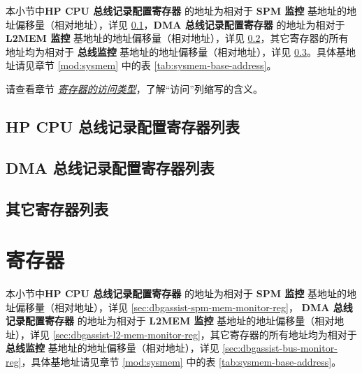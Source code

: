 \documentclass[main\_\_CN.tex]{subfiles}
\begin{document}
本小节中\textbf{HP CPU 总线记录配置寄存器} 的地址为相对于 \textbf{SPM 监控} 基地址的地址偏移量（相对地址），详见 \ref{sec:dbgassist-spm-mem-monitor-reg-summ}，\textbf{DMA 总线记录配置寄存器} 的地址为相对于 \textbf{L2MEM 监控} 基地址的地址偏移量（相对地址），详见 \ref{sec:dbgassist-l2-mem-monitor-reg-summ}，其它寄存器的所有地址均为相对于 \textbf{总线监控} 基地址的地址偏移量（相对地址），详见 \ref{sec:dbgassist-bus-monitor-reg-summ}。具体基地址请见章节 \ref{mod:sysmem} \textit{} 中的表 \ref{tab:sysmem-base-address}。

请查看章节 \hyperref[glossary-access-types]{\textit{寄存器的访问类型}}，了解“访问”列缩写的含义。

\subsection{HP CPU 总线记录配置寄存器列表}
\label{sec:dbgassist-spm-mem-monitor-reg-summ}


\subsection{DMA 总线记录配置寄存器列表}
\label{sec:dbgassist-l2-mem-monitor-reg-summ}


\subsection{其它寄存器列表}
\label{sec:dbgassist-bus-monitor-reg-summ}







\newpage
\section{寄存器}


本小节中\textbf{HP CPU 总线记录配置寄存器} 的地址为相对于 \textbf{SPM 监控} 基地址的地址偏移量（相对地址），详见 \ref{sec:dbgassist-spm-mem-monitor-reg}，\textbf{ DMA 总线记录配置寄存器} 的地址为相对于 \textbf{L2MEM 监控} 基地址的地址偏移量（相对地址），详见 \ref{sec:dbgassist-l2-mem-monitor-reg}，其它寄存器的所有地址均为相对于 \textbf{总线监控} 基地址的地址偏移量（相对地址），详见 \ref{sec:dbgassist-bus-monitor-reg}，具体基地址请见章节 \ref{mod:sysmem} \textit{} 中的表 \ref{tab:sysmem-base-address}。
\end{document}
